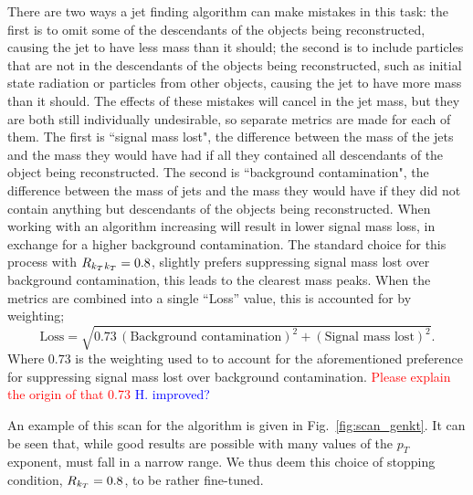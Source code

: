 There are two ways a jet finding algorithm can make mistakes in this task:
the first is to omit some of the descendants of the objects being reconstructed, causing the jet to have less mass than it should;
the second is to include particles that are not in the descendants of the objects being reconstructed, such as initial state radiation or particles from other objects,
causing the jet to have more mass than it should.
The effects of these mistakes will cancel in the jet mass,
but they are both still individually undesirable,
so separate metrics are made for each of them.
The first is ``signal mass lost", the difference between the mass of the jets and the mass they would have had if all they contained all descendants of the object being reconstructed.
The second is ``background contamination", the difference between the mass of jets and the mass they would have if they did not contain anything but descendants of the objects being reconstructed.
When working with an \antikt{} algorithm increasing \ktstoppingdeltar{} will result in lower signal mass loss, in exchange for a higher background contamination.
The standard choice for this process with \(R_{k_T}{}_{k_T}=0.8\), slightly prefers suppressing signal mass lost over background contamination,
this leads to the clearest mass peaks.
When the metrics are combined into a single ``Loss'' value, this is accounted for by weighting;
\begin{equation}\label{eqn:loss}
\text{Loss} = \sqrt{0.73\,(\text{Background contamination})^2 + (\text{Signal mass lost})^2}.
\end{equation}
Where \(0.73\) is the weighting used to to account for the aforementioned preference for suppressing signal mass lost over background contamination.
{\textcolor{red}{Please explain the origin of that 0.73}} {\textcolor{blue}{H. improved?}}

An example of this scan for the \genkt{} algorithm is given in Fig.~\ref{fig:scan_genkt}. 
It can be seen that, while good results are possible with many values of the \(p_T\) exponent,
                \ktstoppingdeltar{} must fall in a narrow range. We thus deem this choice of  stopping condition, \(R{}_{k_T}=0.8\), to be rather fine-tuned.

